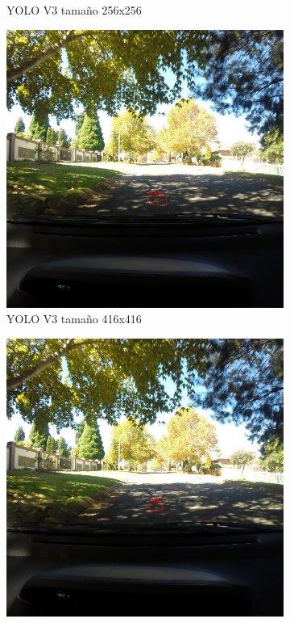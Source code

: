 \begin{figure}[H]
\begin{subfigure}[h]{0.45\linewidth}
		\caption{YOLO V3 tamaño 256x256}
	\end{subfigure}
	\begin{subfigure}[h]{0.45\linewidth}
		\includegraphics[width=\linewidth]{images/results_e_yolo_v3_416.jpg}
		\caption{YOLO V3 tamaño 416x416}
	\end{subfigure}
	\begin{subfigure}[h]{0.45\linewidth}
		\includegraphics[width=\linewidth]{images/results_e_yolo_v3_640.jpg}

\end{subfigure}
\end{figure}
